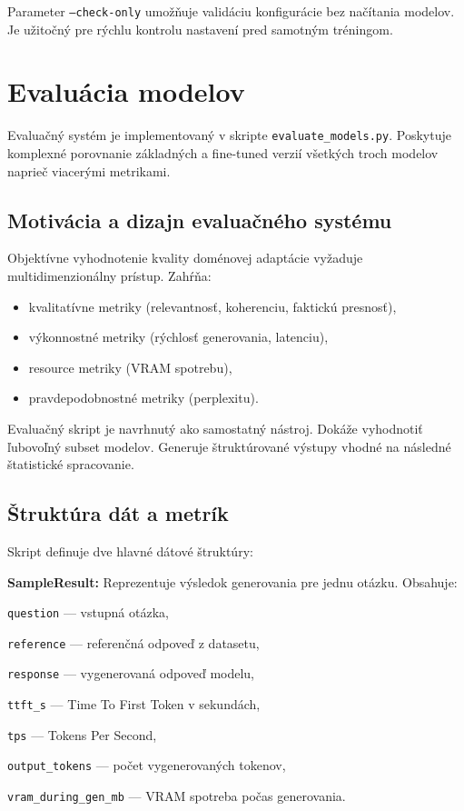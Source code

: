 Parameter \texttt{--check-only} umožňuje validáciu konfigurácie bez načítania modelov. Je užitočný pre rýchlu kontrolu nastavení pred samotným tréningom.
 
\section{Evaluácia modelov}
 
Evaluačný systém je implementovaný v skripte \texttt{evaluate\_models.py}. Poskytuje komplexné porovnanie základných a fine-tuned verzií všetkých troch modelov naprieč viacerými metrikami.
 
\subsection{Motivácia a dizajn evaluačného systému}
 
Objektívne vyhodnotenie kvality doménovej adaptácie vyžaduje multidimenzionálny prístup. Zahŕňa:
\begin{itemize}
    \item kvalitatívne metriky (relevantnosť, koherenciu, faktickú presnosť),
    \item výkonnostné metriky (rýchlosť generovania, latenciu),
    \item resource metriky (VRAM spotrebu),
    \item pravdepodobnostné metriky (perplexitu).
\end{itemize}
 
Evaluačný skript je navrhnutý ako samostatný nástroj. Dokáže vyhodnotiť ľubovoľný subset modelov. Generuje štruktúrované výstupy vhodné na následné štatistické spracovanie.
 
\subsection{Štruktúra dát a metrík}
 
Skript definuje dve hlavné dátové štruktúry:
 
\textbf{SampleResult:} Reprezentuje výsledok generovania pre jednu otázku. Obsahuje:\par\medskip
\noindent\texttt{question} — vstupná otázka,\par\medskip
\noindent\texttt{reference} — referenčná odpoveď z datasetu,\par\medskip
\noindent\texttt{response} — vygenerovaná odpoveď modelu,\par\medskip
\noindent\texttt{ttft\_s} — Time To First Token v sekundách,\par\medskip
\noindent\texttt{tps} — Tokens Per Second,\par\medskip
\noindent\texttt{output\_tokens} — počet vygenerovaných tokenov,\par\medskip
\noindent\texttt{vram\_during\_gen\_mb} — VRAM spotreba počas generovania.\par\medskip
 
